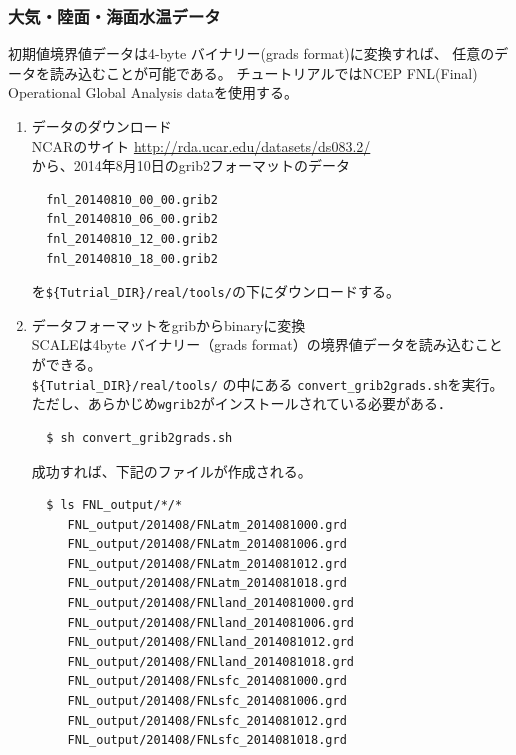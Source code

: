 \subsubsection{大気・陸面・海面水温データ}
\label{sec:real_prep}
初期値境界値データは4-byte バイナリー(grads format)に変換すれば、
任意のデータを読み込むことが可能である。
チュートリアルではNCEP FNL(Final) Operational Global Analysis dataを使用する。
\begin{enumerate}
\item データのダウンロード\\
NCARのサイト
 \url{http://rda.ucar.edu/datasets/ds083.2/}\\
から、2014年8月10日のgrib2フォーマットのデータ
\begin{verbatim}
  fnl_20140810_00_00.grib2
  fnl_20140810_06_00.grib2
  fnl_20140810_12_00.grib2
  fnl_20140810_18_00.grib2
\end{verbatim}
を\verb|${Tutrial_DIR}/real/tools/|の下にダウンロードする。

\item データフォーマットをgribからbinaryに変換\\
 SCALEは4byte バイナリー（grads format）の境界値データを読み込むことができる。\\
\verb|${Tutrial_DIR}/real/tools/| の中にある \verb|convert_grib2grads.sh|を実行。
ただし、あらかじめ\verb|wgrib2|がインストールされている必要がある．
\begin{verbatim}
  $ sh convert_grib2grads.sh
\end{verbatim}
成功すれば、下記のファイルが作成される。
\begin{verbatim}
  $ ls FNL_output/*/*
     FNL_output/201408/FNLatm_2014081000.grd
     FNL_output/201408/FNLatm_2014081006.grd
     FNL_output/201408/FNLatm_2014081012.grd
     FNL_output/201408/FNLatm_2014081018.grd
     FNL_output/201408/FNLland_2014081000.grd
     FNL_output/201408/FNLland_2014081006.grd
     FNL_output/201408/FNLland_2014081012.grd
     FNL_output/201408/FNLland_2014081018.grd
     FNL_output/201408/FNLsfc_2014081000.grd
     FNL_output/201408/FNLsfc_2014081006.grd
     FNL_output/201408/FNLsfc_2014081012.grd
     FNL_output/201408/FNLsfc_2014081018.grd
\end{verbatim}
\end{enumerate}

